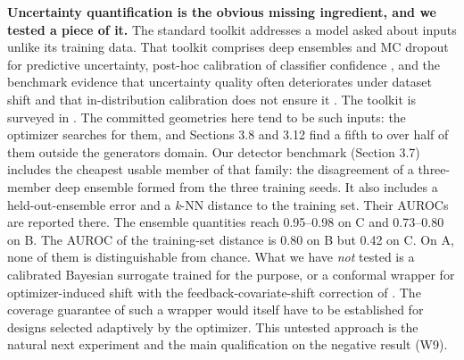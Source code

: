 \documentclass[11pt,a4paper]{article}
\newcounter{none}   %
\begin{document}
\textbf{Uncertainty quantification is the obvious missing ingredient, and we tested a piece of
it.} The standard toolkit addresses a model asked about inputs unlike its training data.
That toolkit comprises deep ensembles \cite{lakshminarayanan201747} and MC dropout \cite{gal201648} for predictive uncertainty,
post-hoc calibration of classifier confidence \cite{guo201749}, and the benchmark evidence that
uncertainty quality often deteriorates under dataset shift and that in-distribution
calibration does not ensure it \cite{al201950}. The toolkit is surveyed in \cite{al202151}. The committed
geometries here tend to be such inputs: the optimizer searches for them, and
Sections 3.8 and 3.12 find a fifth to over half of them outside the generator\textquotesingle s domain.
Our detector benchmark (Section 3.7) includes the cheapest usable member of that family:
the disagreement of a three-member deep ensemble formed from the three training seeds. It
also includes a held-out-ensemble error and a \emph{k}-NN distance to the training set. Their
AUROCs are reported there. The ensemble quantities reach 0.95--0.98 on C and 0.73--0.80 on
B. The AUROC of the training-set distance is 0.80 on B but 0.42 on C. On A, none of them
is distinguishable from chance. What we have \emph{not} tested is a calibrated Bayesian
surrogate trained for the purpose, or a conformal wrapper for optimizer-induced shift with
the feedback-covariate-shift correction of \cite{fannjiang202259}. The coverage guarantee of such a wrapper
would itself have to be established for designs selected adaptively by the optimizer. This
untested approach is the natural next experiment and the main qualification on the
negative result (W9).
\end{document}
